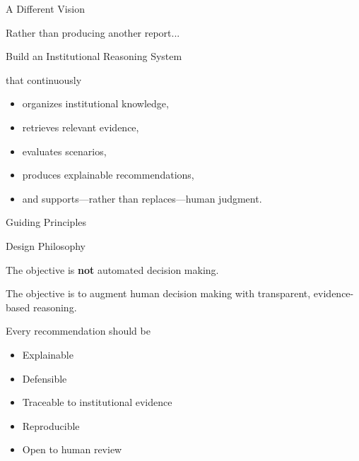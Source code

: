 \documentclass[aspectratio=169]{beamer}
\begin{document}
\begin{frame}{A Different Vision}

\Large

Rather than producing another report...

\vspace{0.8cm}

\begin{center}

{\Huge Build an Institutional Reasoning System}

\end{center}

\vspace{0.8cm}

that continuously

\begin{itemize}
\item organizes institutional knowledge,
\item retrieves relevant evidence,
\item evaluates scenarios,
\item produces explainable recommendations,
\item and supports---rather than replaces---human judgment.
\end{itemize}

\end{frame}

\begin{frame}{Guiding Principles}

\begin{block}{Design Philosophy}

The objective is \textbf{not} automated decision making.

\vspace{0.3cm}

The objective is to augment human decision making with
transparent, evidence-based reasoning.

\end{block}

\vspace{0.5cm}

Every recommendation should be

\begin{itemize}

\item Explainable

\item Defensible

\item Traceable to institutional evidence

\item Reproducible

\item Open to human review

\end{itemize}

\end{frame}
\end{document}

